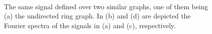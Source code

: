 \begin{figure}
\begin{minipage}[c]{0.24\linewidth}
{		}
	\end{minipage}%
	\begin{minipage}[c]{0.24\linewidth}
		~
	\end{minipage}%
	\begin{minipage}[c]{0.25\linewidth}
	\end{minipage}%
	\caption{The same signal defined over two similar graphs, one of them being (a) the undirected ring graph. In (b) and (d) are depicted the Fourier spectra of the signals in (a) and (c), respectively.}%
	\label{fig:diff_struct}%
	\vspace{-0.2cm}
\end{figure}

